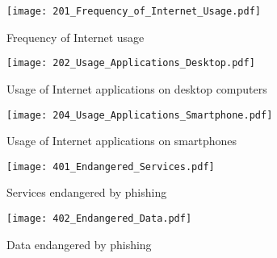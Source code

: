 \begin{figure}[hHtbp]
\centering
\texttt{[image: 201\_Frequency\_of\_Internet\_Usage.pdf]}
\caption{Frequency of Internet usage}
\label{fig:internet_usage}
\end{figure}


\begin{figure}[hHtbp]
\centering
\texttt{[image: 202\_Usage\_Applications\_Desktop.pdf]}%
\caption{Usage of Internet applications on desktop computers}%
\label{fig:desktop_apps}%
\end{figure}

\begin{figure}[hHtbp]
\texttt{[image: 204\_Usage\_Applications\_Smartphone.pdf]}%
\caption{Usage of Internet applications on smartphones}%
\label{fig:smartphone_apps}%
\end{figure}

\begin{figure}[hHtbp]
\texttt{[image: 401\_Endangered\_Services.pdf]}%
\caption{Services endangered by phishing}%
\label{fig:endangered_services}%
\end{figure}

\begin{figure}[hHtbp]
\texttt{[image: 402\_Endangered\_Data.pdf]}%
\caption{Data endangered by phishing}%
\label{fig:endangered_data}%
\end{figure}
